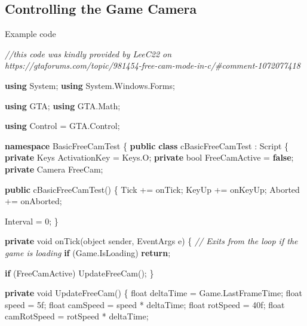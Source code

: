 \documentclass[
  openany]{book}
\newenvironment{Shaded}{\begin{snugshade}}{\end{snugshade}}
\newcommand{\CommentTok}[1]{\textcolor[rgb]{0.56,0.35,0.01}{\textit{#1}}}
\newcommand{\DataTypeTok}[1]{\textcolor[rgb]{0.13,0.29,0.53}{#1}}
\newcommand{\DecValTok}[1]{\textcolor[rgb]{0.00,0.00,0.81}{#1}}
\newcommand{\FunctionTok}[1]{\textcolor[rgb]{0.00,0.00,0.00}{#1}}
\newcommand{\KeywordTok}[1]{\textcolor[rgb]{0.13,0.29,0.53}{\textbf{#1}}}
\newcommand{\NormalTok}[1]{#1}
\begin{document}
\hypertarget{controlling-the-game-camera}{%
\subsection*{Controlling the Game Camera}\label{controlling-the-game-camera}}

Example code

\begin{Shaded}
\begin{Highlighting}[]
\CommentTok{//this code was kindly provided by LeeC22 on https://gtaforums.com/topic/981454-free-cam-mode-in-c/#comment-1072077418}

\KeywordTok{using}\NormalTok{ System;}
\KeywordTok{using}\NormalTok{ System.}\FunctionTok{Windows}\NormalTok{.}\FunctionTok{Forms}\NormalTok{;}

\KeywordTok{using}\NormalTok{ GTA;}
\KeywordTok{using}\NormalTok{ GTA.}\FunctionTok{Math}\NormalTok{;}

\KeywordTok{using}\NormalTok{ Control = GTA.}\FunctionTok{Control}\NormalTok{;}

\KeywordTok{namespace}\NormalTok{ BasicFreeCamTest}
\NormalTok{\{}
    \KeywordTok{public} \KeywordTok{class}\NormalTok{ cBasicFreeCamTest : Script}
\NormalTok{    \{}
        \KeywordTok{private}\NormalTok{ Keys ActivationKey = Keys.}\FunctionTok{O}\NormalTok{;}
        \KeywordTok{private} \DataTypeTok{bool}\NormalTok{ FreeCamActive = }\KeywordTok{false}\NormalTok{;}
        \KeywordTok{private}\NormalTok{ Camera FreeCam;}

        \KeywordTok{public} \FunctionTok{cBasicFreeCamTest}\NormalTok{()}
\NormalTok{        \{}
\NormalTok{            Tick += onTick;}
\NormalTok{            KeyUp += onKeyUp;}
\NormalTok{            Aborted += onAborted;}

\NormalTok{            Interval = }\DecValTok{0}\NormalTok{;}
\NormalTok{        \}}

        \KeywordTok{private} \DataTypeTok{void} \FunctionTok{onTick}\NormalTok{(}\DataTypeTok{object}\NormalTok{ sender, EventArgs e)}
\NormalTok{        \{}
            \CommentTok{// Exits from the loop if the game is loading}
            \KeywordTok{if}\NormalTok{ (Game.}\FunctionTok{IsLoading}\NormalTok{) }\KeywordTok{return}\NormalTok{;}

            \KeywordTok{if}\NormalTok{ (FreeCamActive) }\FunctionTok{UpdateFreeCam}\NormalTok{();}
\NormalTok{        \}}

        \KeywordTok{private} \DataTypeTok{void} \FunctionTok{UpdateFreeCam}\NormalTok{()}
\NormalTok{        \{}
            \DataTypeTok{float}\NormalTok{ deltaTime = Game.}\FunctionTok{LastFrameTime}\NormalTok{;}
            \DataTypeTok{float}\NormalTok{ speed = 5f;}
            \DataTypeTok{float}\NormalTok{ camSpeed = speed * deltaTime;}
            \DataTypeTok{float}\NormalTok{ rotSpeed = 40f;}
            \DataTypeTok{float}\NormalTok{ camRotSpeed = rotSpeed * deltaTime;}


\end{Highlighting}
\end{Shaded}
\end{document}
